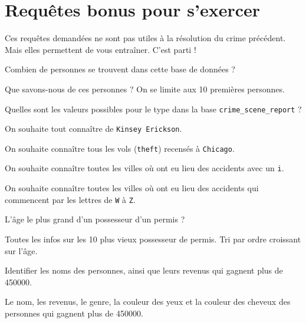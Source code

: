 \section{Requêtes bonus pour s'exercer}
Ces requêtes demandées ne sont pas utiles à la résolution du crime précédent. Mais elles permettent de vous entraîner. C'est parti !

\question{}
Combien de personnes se trouvent dans cette base de données ?


\question{}
Que savons-nous de ces personnes ? On se limite aux 10 premières personnes.


\question{}
Quelles sont les valeurs possibles pour le type dans la base \texttt{crime\_scene\_report} ?


\question{}
On souhaite tout connaître de \texttt{Kinsey Erickson}.



\question{}
On souhaite connaître tous les vols (\texttt{theft}) recensés à \texttt{Chicago}.


\question{}
On souhaite connaître toutes les villes où ont eu lieu des accidents avec un \texttt{i}.


\question{}
On souhaite connaître toutes les villes où ont eu lieu des accidents qui commencent par les lettres  de \texttt{W} à \texttt{Z}.



\question{}
L'âge le plus grand d'un possesseur d'un permis ?



\question{}
Toutes les infos sur les 10 plus vieux possesseur de permis. Tri par ordre croissant sur l'âge.



\question{}
Identifier les noms des personnes, ainsi que leurs revenus qui gagnent plus de \num{450000}.



\question{}
Le nom, les revenus, le genre, la couleur des yeux et la couleur des cheveux des personnes qui gagnent plus de \num{450000}.



